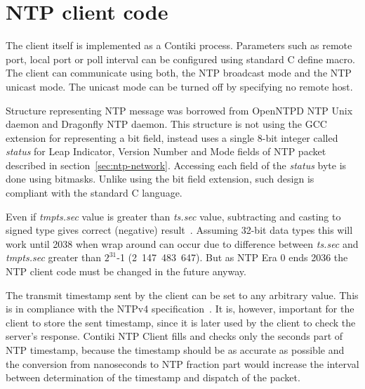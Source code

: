 
\section{NTP client code}
The client itself is implemented as a Contiki process.
Parameters such as remote port, local port or poll interval
can be configured using standard C define macro.
The client can communicate using both,
the NTP broadcast mode and the NTP unicast mode.
The unicast mode can be turned off by specifying no remote host.

Structure representing NTP message was borrowed from OpenNTPD NTP Unix daemon
and Dragonfly NTP daemon.
This structure is not using the GCC extension for representing a bit field,
instead uses a single 8-bit integer called {\it{status}}
for Leap Indicator, Version Number and Mode fields of NTP packet
described in section~\ref{sec:ntp-network}.
Accessing each field of the {\it{status}} byte is done using bitmasks.
Unlike using the bit field extension,
such design is compliant with the standard C language.




Even if {\it{tmpts.sec}} value is greater than {\it{ts.sec}} value,
subtracting and casting to signed type gives correct (negative) result~\cite{c99}.
Assuming 32-bit data types this will work until 2038 when wrap around can occur due to difference
between {\it{ts.sec}} and {\it{tmpts.sec}} greater than $2^{31}$-1 (2~147~483~647).
But as NTP Era 0 ends 2036 the NTP client code must be changed in the future anyway.



The transmit timestamp sent by the client can be set to any arbitrary value.
This is in compliance with the NTPv4 specification~\cite{rfc5905}.
It is, however, important for the client to store the sent timestamp,
since it is later used by the client to check the server's response.
Contiki NTP Client fills and checks only the seconds part of NTP timestamp,
because the timestamp should be as accurate as possible and the
conversion from nanoseconds to NTP fraction part would increase the interval
between determination of the timestamp and dispatch of the packet.


